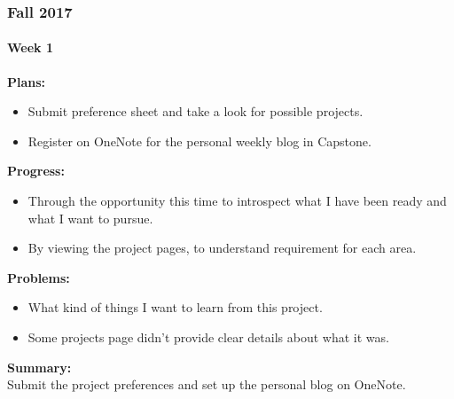 \subsubsection{Fall 2017}

\paragraph{Week 1}
\begin{adjustwidth}{2.5em}{0pt}
    \vspace{-0.5cm}\textbf{Plans:}
    \vspace{-0.5cm}
    \begin{itemize}
        \item Submit preference sheet and take a look for possible projects.
        \item Register on OneNote for the personal weekly blog in Capstone.
    \end{itemize} 
    \vspace{-0.3cm}\textbf{Progress:}
    \vspace{-0.5cm}
    \begin{itemize}
        \item Through the opportunity this time to introspect what I have been ready and what I want to pursue. 
        \item By viewing the project pages, to understand requirement for each area.
    \end{itemize} 
    \vspace{-0.3cm}\textbf{Problems:}
    \vspace{-0.5cm}
    \begin{itemize}
        \item What kind of things I want to learn from this project.
        \item Some projects page didn't provide clear details about what it was.
    \end{itemize}  
    \vspace{-0.3cm}\noindent\textbf{Summary:}\\
    \noindent  Submit the project preferences and set up the personal blog on OneNote. \\
\end{adjustwidth}


